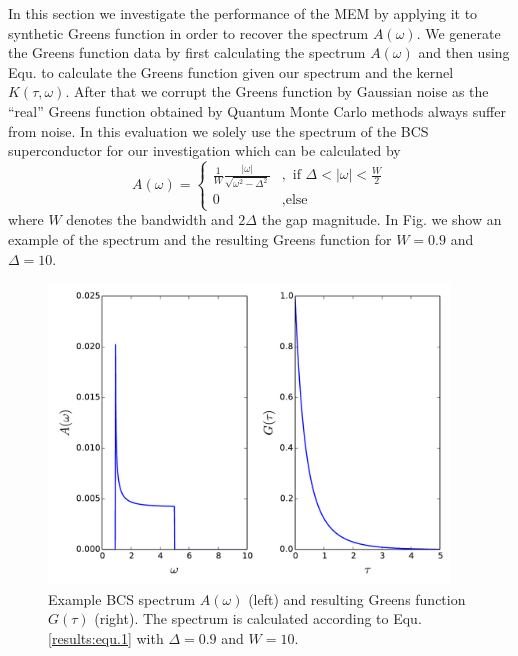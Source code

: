 In this section we investigate the performance of the MEM by applying it to synthetic Greens function in order to recover the spectrum $A(\omega)$. We generate the Greens function data by first calculating the spectrum $A(\omega)$ and then using Equ. to calculate the Greens function given our spectrum and the kernel $K(\tau,\omega)$. After that we corrupt the Greens function by Gaussian noise as the ``real'' Greens function obtained by Quantum Monte Carlo methods always suffer from noise. In this evaluation we solely use the spectrum of the BCS superconductor for our investigation which can be calculated by 
\begin{equation}
	A(\omega) = 
		\begin{cases}
			\frac{1}{W} \frac{|\omega|}{\sqrt{\omega^2 - \Delta^2}}&, \text{ if } \Delta < |\omega| < \frac{W}{2} \\
			0 &, \text{else}
		\end{cases}
	\label{results:equ.1}
\end{equation}
where $W$ denotes the bandwidth and $2\Delta$ the gap magnitude.
In Fig. we show an example of the spectrum and the resulting Greens function for $W = 0.9$ and $\Delta = 10$.
\begin{figure}[htbp]
	\centering
	\includegraphics[width=0.95\textwidth]{./images/BCS_A_G_example.pdf}
	\caption{Example BCS spectrum $A(\omega)$ (left) and resulting Greens function $G(\tau)$ (right). The spectrum is calculated according to Equ. \ref{results:equ.1} with $\Delta = 0.9$ and $W = 10$.}
	\label{results:fig.1}
\end{figure}
\FloatBarrier
